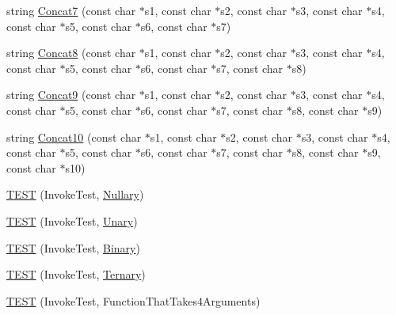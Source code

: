\begin{DoxyCompactItemize}
\item 
string \hyperlink{namespacetesting_1_1gmock__more__actions__test_a5628f71ebb5ae61a6e56396145a76da4}{Concat7} (const char $\ast$s1, const char $\ast$s2, const char $\ast$s3, const char $\ast$s4, const char $\ast$s5, const char $\ast$s6, const char $\ast$s7)
\item 
string \hyperlink{namespacetesting_1_1gmock__more__actions__test_a122e4affe78745eef3dd748e88bd248c}{Concat8} (const char $\ast$s1, const char $\ast$s2, const char $\ast$s3, const char $\ast$s4, const char $\ast$s5, const char $\ast$s6, const char $\ast$s7, const char $\ast$s8)
\item 
string \hyperlink{namespacetesting_1_1gmock__more__actions__test_a9f8c8c01bc080a04d798060dad757cf9}{Concat9} (const char $\ast$s1, const char $\ast$s2, const char $\ast$s3, const char $\ast$s4, const char $\ast$s5, const char $\ast$s6, const char $\ast$s7, const char $\ast$s8, const char $\ast$s9)
\item 
string \hyperlink{namespacetesting_1_1gmock__more__actions__test_aba6aadf0de090a08bf9e467cdc09ffd8}{Concat10} (const char $\ast$s1, const char $\ast$s2, const char $\ast$s3, const char $\ast$s4, const char $\ast$s5, const char $\ast$s6, const char $\ast$s7, const char $\ast$s8, const char $\ast$s9, const char $\ast$s10)
\item 
\hyperlink{namespacetesting_1_1gmock__more__actions__test_a9c5fbd26c6cc6ed31aed5bafb2fa8e5c}{T\+E\+ST} (Invoke\+Test, \hyperlink{namespacetesting_1_1gmock__more__actions__test_acdd2dd80f777fdb770b513b63064ac19}{Nullary})
\item 
\hyperlink{namespacetesting_1_1gmock__more__actions__test_a28b57a9f9d38574b7c033988ad528ddd}{T\+E\+ST} (Invoke\+Test, \hyperlink{namespacetesting_1_1gmock__more__actions__test_aad456ea2ee1b0cb2741b676a34f540a3}{Unary})
\item 
\hyperlink{namespacetesting_1_1gmock__more__actions__test_a906bd5cc7aa38e2cc861a9732481fce7}{T\+E\+ST} (Invoke\+Test, \hyperlink{namespacetesting_1_1gmock__more__actions__test_a853c9f048674a60798b930750b74a1df}{Binary})
\item 
\hyperlink{namespacetesting_1_1gmock__more__actions__test_a424fb6113c6c1ab2157edf854a4ae9fe}{T\+E\+ST} (Invoke\+Test, \hyperlink{namespacetesting_1_1gmock__more__actions__test_ab98b352528a0b72625b4710a6fc648a1}{Ternary})
\item 
\hyperlink{namespacetesting_1_1gmock__more__actions__test_a17f41c1f7f180371d4d240089cdff0dd}{T\+E\+ST} (Invoke\+Test, Function\+That\+Takes4\+Arguments)

\end{DoxyCompactItemize}
